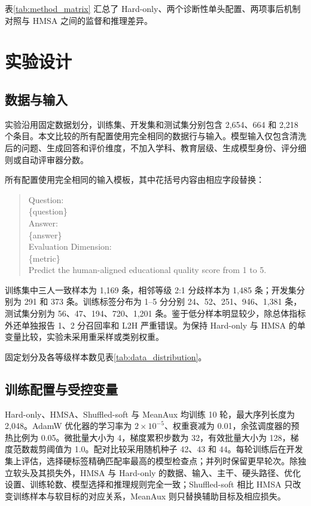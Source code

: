 \documentclass[UTF8,fontset=fandol,a4paper,11pt]{ctexart}
\begin{document}
表\ref{tab:method_matrix} 汇总了 Hard-only、两个诊断性单头配置、两项事后机制对照与 HMSA 之间的监督和推理差异。



\FloatBarrier
\section{实验设计}

\subsection{数据与输入}

实验沿用固定数据划分，训练集、开发集和测试集分别包含 2,654、664 和 2,218 个条目。本文比较的所有配置使用完全相同的数据行与输入。模型输入仅包含清洗后的问题、生成回答和评价维度，不加入学科、教育层级、生成模型身份、评分细则或自动评审器分数。

所有配置使用完全相同的输入模板，其中花括号内容由相应字段替换：
\begin{quote}
\small\ttfamily
Question:\\
\{question\}\\[0.35em]
Answer:\\
\{answer\}\\[0.35em]
Evaluation Dimension:\\
\{metric\}\\[0.35em]
Predict the human-aligned educational quality score from 1 to 5.
\end{quote}

训练集中三人一致样本为 1,169 条，相邻等级 2:1 分歧样本为 1,485 条；开发集分别为 291 和 373 条。训练标签分布为 1--5 分分别 24、52、251、946、1,381 条，测试集分别为 56、47、194、720、1,201 条。鉴于低分样本明显较少，除总体指标外还单独报告 1、2 分召回率和 L2H 严重错误。为保持 Hard-only 与 HMSA 的单变量比较，实验未采用重采样或类别权重。

固定划分及各等级样本数见表\ref{tab:data_distribution}。



\subsection{训练配置与受控变量}

Hard-only、HMSA、Shuffled-soft 与 MeanAux 均训练 10 轮，最大序列长度为 2,048。AdamW 优化器的学习率为 $2\times10^{-5}$、权重衰减为 0.01，余弦调度器的预热比例为 0.05。微批量大小为 4，梯度累积步数为 32，有效批量大小为 128，梯度范数裁剪阈值为 1.0。配对比较采用随机种子 42、43 和 44。每轮训练后在开发集上评估，选择硬标签精确匹配率最高的模型检查点；并列时保留更早轮次。除独立软头及其损失外，HMSA 与 Hard-only 的数据、输入、主干、硬头路径、优化设置、训练轮数、模型选择和推理规则完全一致；Shuffled-soft 相比 HMSA 只改变训练样本与软目标的对应关系，MeanAux 则只替换辅助目标及相应损失。
\end{document}
